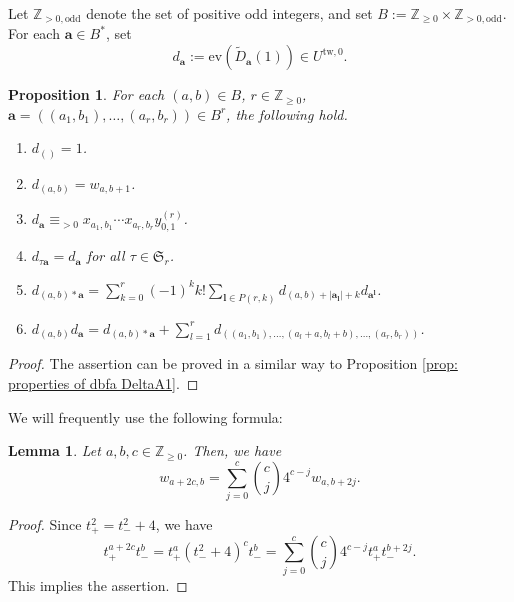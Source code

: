 \documentclass[12pt,a4paper]{amsart}
\newtheorem{lem}[thm]{Lemma}
\newtheorem{prop}[thm]{Proposition}
\theoremstyle{definition}
\numberwithin{equation}{subsection}
\begin{document}
Let $\mathbb{Z}_{> 0, \mathrm{odd}}$ denote the set of positive odd integers, and set $B := \mathbb{Z}_{\geq 0} \times \mathbb{Z}_{> 0,\mathrm{odd}}$.
For each $\mathbf{a} \in B^*$, set
\[
  d_\mathbf{a} := \mathrm{ev}(\tilde{D}_\mathbf{a}(1)) \in U^{\mathrm{tw}, 0}.
\]

\begin{prop}\label{prop: properties of dbfa AI1}
  For each $(a,b) \in B$, $r \in \mathbb{Z}_{\geq 0}$, $\mathbf{a} = ((a_1,b_1),\dots,(a_r,b_r)) \in B^r$, the following hold.
  \begin{enumerate}
    \item $d_{()} = 1$.
    \item $d_{(a,b)} = w_{a,b+1}$.
    \item\label{item: dbfa equiv xy AI1} $d_\mathbf{a} \equiv_{> 0} x_{a_1,b_1} \cdots x_{a_r,b_r} y_{0,1}^{(r)}$.
    \item $d_{\tau \mathbf{a}} = d_\mathbf{a}$ for all $\tau \in \mathfrak{S}_r$.
    \item $d_{(a,b)*\mathbf{a}} = \sum_{k=0}^r (-1)^k k! \sum_{\mathbf{l} \in P(r,k)} d_{(a,b)+|\mathbf{a}_\mathbf{l}|+k} d_{\mathbf{a}^\mathbf{l}}$.
    \item $d_{(a,b)} d_\mathbf{a} = d_{(a,b)*\mathbf{a}} + \sum_{l=1}^r d_{((a_1,b_1),\dots,(a_l+a,b_l+b),\dots,(a_r,b_r))}$.
  \end{enumerate}
\end{prop}
\begin{proof}
  The assertion can be proved in a similar way to Proposition \ref{prop: properties of dbfa DeltaA1}.
\end{proof}

We will frequently use the following formula:

\begin{lem}\label{lem: binom formula}
  Let $a,b,c \in \mathbb{Z}_{\geq 0}$.
  Then, we have
  \[
    w_{a+2c,b} = \sum_{j=0}^c \binom{c}{j} 4^{c-j} w_{a,b+2j}.
  \]
\end{lem}
\begin{proof}
  Since $t_+^2 = t_-^2+4$, we have
  \[
    t_+^{a+2c} t_-^b = t_+^a(t_-^2+4)^ct_-^b = \sum_{j=0}^c \binom{c}{j} 4^{c-j} t_+^at_-^{b+2j}.
  \]
  This implies the assertion.
\end{proof}
\end{document}
